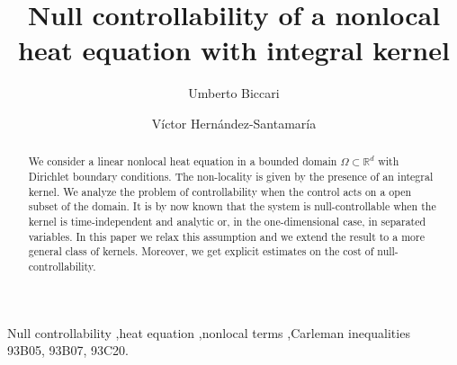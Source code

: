 \documentclass[preprint,1p]{elsarticle}
\title{{\bf Null controllability of a nonlocal heat equation with integral kernel}}
\author[rvt,els]{Umberto Biccari \corref{cor1}}
\author[rvt,els]{V\'ictor Hern\'andez-Santamar\'ia}
\begin{document}
           
	
	\begin{abstract}
		We consider a linear nonlocal heat equation in a bounded domain $\Omega\subset\mathbb{R}^d$ with Dirichlet boundary conditions. The non-locality is given by the presence of an integral kernel. We analyze the problem of controllability when the control acts on a open subset of the domain. It is by now known that the system is null-controllable when the kernel is time-independent and analytic or, in the one-dimensional case, in separated variables. In this paper we relax this assumption and we extend the result to a more general class of kernels. Moreover, we get explicit estimates on the cost of null-controllability.
	\end{abstract}
	
	\begin{keyword}
		Null controllability \sep heat equation \sep nonlocal terms \sep Carleman inequalities
		\\
		\MSC[2010] 93B05, 93B07, 93C20.
	\end{keyword}
	
	\maketitle
	
\end{document}
